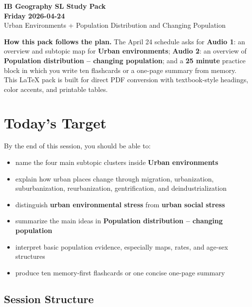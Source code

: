 \documentclass[11pt,a4paper]{article}
\newcommand{\term}[1]{\textcolor{HeadingBlue}{\textbf{#1}}}
\begin{document}
\begin{center}
  {\sffamily\bfseries\color{HeadingBlue}\LARGE IB Geography SL Study Pack}\\[0.25em]
  {\sffamily\bfseries\color{AccentTeal}\Large Friday 2026-04-24}\\[0.35em]
  {\sffamily\color{TextInk}Urban Environments + Population Distribution and Changing Population}
\end{center}

\vspace{0.5em}

\noindent\colorbox{SoftBlue}{%
  \begin{minipage}{0.965\textwidth}
  \sffamily
  \textbf{\textcolor{HeadingBlue}{How this pack follows the plan.}}
  The April 24 schedule asks for \term{Audio 1}: an overview and subtopic map for
  \term{Urban environments}; \term{Audio 2}: an overview of
  \term{Population distribution -- changing population}; and a \term{25 minute}
  practice block in which you write ten flashcards or a one-page summary from
  memory. This LaTeX pack is built for direct PDF conversion with textbook-style
  headings, color accents, and printable tables.
  \end{minipage}
}

\section{Today's Target}

By the end of this session, you should be able to:

\begin{itemize}
  \item name the four main subtopic clusters inside \term{Urban environments}
  \item explain how urban places change through migration, urbanization,
  suburbanization, reurbanization, gentrification, and deindustrialization
  \item distinguish \term{urban environmental stress} from \term{urban social stress}
  \item summarize the main ideas in \term{Population distribution -- changing population}
  \item interpret basic population evidence, especially maps, rates, and age-sex
  structures
  \item produce ten memory-first flashcards or one concise one-page summary
\end{itemize}

\subsection{Session Structure}
\end{document}

